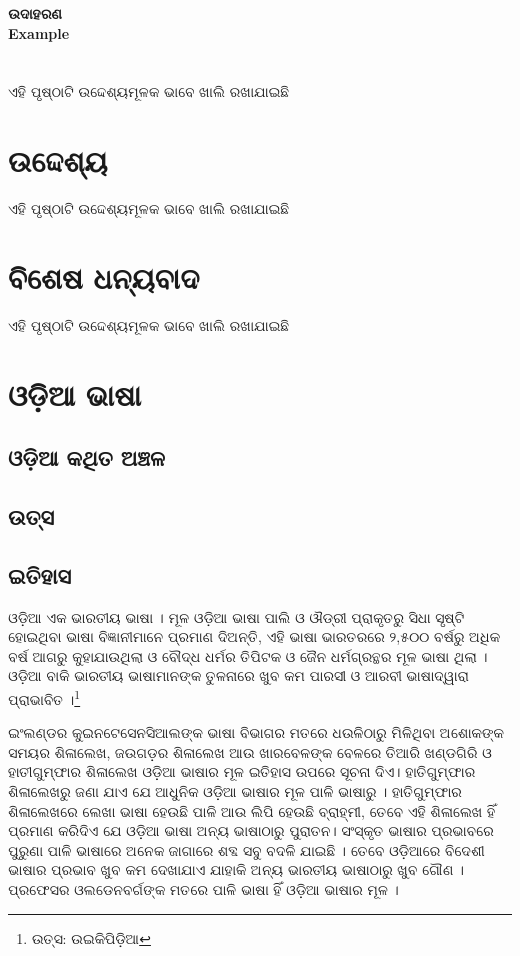 \documentclass{article}
\begin{document}
\begin{titlepage}
\begin{center}
\Huge\bfseries ଉଦାହରଣ\\
\textenglish {Example}
\end{center}
\end{titlepage}

\tableofcontents
\clearpage
 

\section {\abstractname}
ଏହି ପୃଷ୍ଠାଟି ଉଦ୍ଦେଶ୍ୟମୂଳକ ଭାବେ ଖାଲି ରଖାଯାଇଛି
\clearpage
\section{ଉଦ୍ଦେଶ୍ୟ}
ଏହି ପୃଷ୍ଠାଟି ଉଦ୍ଦେଶ୍ୟମୂଳକ ଭାବେ ଖାଲି ରଖାଯାଇଛି
\clearpage
\section{ବିଶେଷ ଧନ୍ୟବାଦ}
ଏହି ପୃଷ୍ଠାଟି ଉଦ୍ଦେଶ୍ୟମୂଳକ ଭାବେ ଖାଲି ରଖାଯାଇଛି
\clearpage

\setcounter{page}{1} %

\section{ଓଡ଼ିଆ ଭାଷା}

\subsection{ଓଡ଼ିଆ କଥିତ ଅଞ୍ଚଳ}
\subsection{ଉତ୍ସ}
\subsection{ଇତିହାସ}
ଓଡ଼ିଆ ଏକ ଭାରତୀୟ ଭାଷା । ମୂଳ ଓଡ଼ିଆ ଭାଷା ପାଲି ଓ ଔଡ୍ରୀ ପ୍ରାକୃତରୁ ସିଧା ସୃଷ୍ଟି ହୋଇଥିବା ଭାଷା ବିଜ୍ଞାନୀମାନେ ପ୍ରମାଣ ଦିଅନ୍ତି, ଏହି ଭାଷା ଭାରତରରେ ୨,୫୦୦ ବର୍ଷରୁ ଅଧିକ ବର୍ଷ ଆଗରୁ କୁହାଯାଉଥିଲା ଓ ବୌଦ୍ଧ ଧର୍ମର ତିପିଟକ ଓ ଜୈନ ଧର୍ମଗ୍ରନ୍ଥର ମୂଳ ଭାଷା ଥିଲା । ଓଡ଼ିଆ ବାକି ଭାରତୀୟ ଭାଷାମାନଙ୍କ ତୁଳନାରେ ଖୁବ କମ ପାରସୀ ଓ ଆରବୀ ଭାଷାଦ୍ୱାରା ପ୍ରାଭାବିତ ।\footnote{ ଉତ୍ସ: ଉଇକିପିଡ଼ିଆ}

ଇଂଲଣ୍ଡର କୁଇନଟେସେନସିଆଲଙ୍କ ଭାଷା ବିଭାଗର ମତରେ ଧଉଳିଠାରୁ ମିଳିଥିବା ଅଶୋକଙ୍କ ସମୟର ଶିଳାଲେଖ, ଜଉଗଡ଼ର ଶିଳାଲେଖ ଆଉ ଖାରବେଳଙ୍କ ବେଳରେ ତିଆରି ଖଣ୍ଡଗିରି ଓ ହାତୀଗୁମ୍ଫାର ଶିଳାଲେଖ ଓଡ଼ିଆ ଭାଷାର ମୂଳ ଇତିହାସ ଉପରେ ସୂଚନା ଦିଏ। ହାତିଗୁମ୍ଫାର ଶିଳାଲେଖରୁ ଜଣା ଯାଏ ଯେ ଆଧୁନିକ ଓଡ଼ିଆ ଭାଷାର ମୂଳ ପାଳି ଭାଷାରୁ । ହାତିଗୁମ୍ଫାର ଶିଳାଲେଖରେ ଲେଖା ଭାଷା ହେଉଛି ପାଳି ଆଉ ଲିପି ହେଉଛି ବ୍ରାହ୍ମୀ, ତେବେ ଏହି ଶିଳାଲେଖ ହିଁ ପ୍ରମାଣ କରିଦିଏ ଯେ ଓଡ଼ିଆ ଭାଷା ଅନ୍ୟ ଭାଷାଠାରୁ ପୁରାତନ। ସଂସ୍କୃତ ଭାଷାର ପ୍ରଭାବରେ ପୁରୁଣା ପାଳି ଭାଷାରେ ଅନେକ ଜାଗାରେ ଶବ୍ଦ ସବୁ ବଦଳି ଯାଇଛି । ତେବେ ଓଡ଼ିଆରେ ବିଦେଶୀ ଭାଷାର ପ୍ରଭାବ ଖୁବ କମ ଦେଖାଯାଏ ଯାହାକି ଅନ୍ୟ ଭାରତୀୟ ଭାଷାଠାରୁ ଖୁବ ଗୌଣ । ପ୍ରଫେସର ଓଲଡେନବର୍ଗଙ୍କ ମତରେ ପାଳି ଭାଷା ହିଁ ଓଡ଼ିଆ ଭାଷାର ମୂଳ ।
\end{document}
